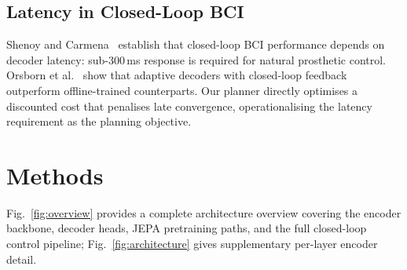 \documentclass[journal]{IEEEtran}
\begin{document}
\subsection{Latency in Closed-Loop BCI}
Shenoy and Carmena~\cite{shenoy2013combining} establish that closed-loop BCI performance depends on decoder latency: sub-300\,ms response is required for natural prosthetic control.
Orsborn et al.~\cite{orsborn2014closed} show that adaptive decoders with closed-loop feedback outperform offline-trained counterparts.
Our planner directly optimises a discounted cost that penalises late convergence, operationalising the latency requirement as the planning objective.


\section{Methods}
\label{sec:methods}

Fig.~\ref{fig:overview} provides a complete architecture overview covering the encoder backbone, decoder heads, JEPA pretraining paths, and the full closed-loop control pipeline; Fig.~\ref{fig:architecture} gives supplementary per-layer encoder detail.
\end{document}
